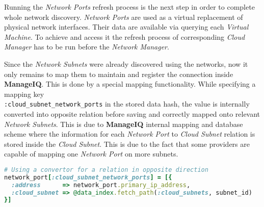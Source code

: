 Running the \emph{Network Ports} refresh process is the next step in order to complete whole network discovery. \emph{Network Ports} are used as a virtual replacement of physical network interfaces. Their data are available via querying each \emph{Virtual Machine}. To achieve and access it the refresh process of corresponding \emph{Cloud Manager} has to be run before the \emph{Network Manager}.

Since the \emph{Network Subnets} were already discovered using the networks, now it only remains to map them to maintain and register the connection inside \textbf{ManageIQ}. This is done by a special mapping functionality. While specifying a mapping key \\ \verb|:cloud_subnet_network_ports| in the stored data hash, the value is internally converted into opposite relation before saving and correctly mapped onto relevant \emph{Network Subnets}. This is due to \textbf{ManageIQ} internal mapping and database scheme where the information for each \emph{Network Port} to \emph{Cloud Subnet} relation is stored inside the \emph{Cloud Subnet}. This is due to the fact that some providers are capable of mapping one \emph{Network Port} on more subnets.

\begin{lstlisting}[language=Ruby,caption={\emph{Network port} to \emph{Cloud subnet} mapping},label=code:port_to_subnet]
# Using a convertor for a relation in opposite direction
network_port[:cloud_subnet_network_ports] = [{
  :address      => network_port.primary_ip_address,
  :cloud_subnet => @data_index.fetch_path(:cloud_subnets, subnet_id)
}]
\end{lstlisting}

